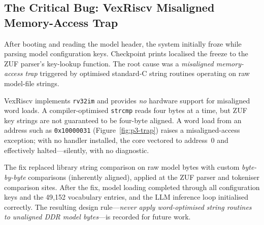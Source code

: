 \subsection{The Critical Bug: VexRiscv Misaligned Memory-Access Trap}

After booting and reading the model header, the system initially froze while parsing model
configuration keys. Checkpoint prints localised the freeze to the ZUF parser's key-lookup function.
The root cause was a \emph{misaligned memory-access trap} triggered by optimised standard-C string
routines operating on raw model-file strings.

VexRiscv implements \texttt{rv32im} and provides \emph{no} hardware support for misaligned word
loads. A compiler-optimised \texttt{strcmp} reads four bytes at a time, but ZUF key strings are not
guaranteed to be four-byte aligned. A word load from an address such as \texttt{0x10000031}
(Figure~\ref{fig:p3-trap}) raises a misaligned-access exception; with no handler installed, the core
vectored to address~0 and effectively halted---silently, with no diagnostic.

The fix replaced library string comparison on raw model bytes with custom \emph{byte-by-byte}
comparisons (inherently aligned), applied at the ZUF parser and tokeniser comparison sites. After
the fix, model loading completed through all configuration keys and the 49{,}152 vocabulary entries,
and the LLM inference loop initialised correctly. The resulting design rule---\emph{never apply
word-optimised string routines to unaligned DDR model bytes}---is recorded for future work.

